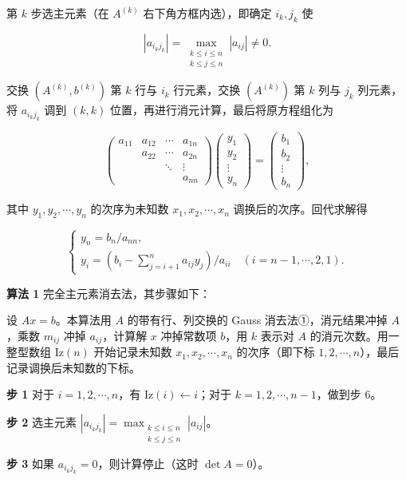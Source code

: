 \documentclass[
  10pt,
  fontset=fandol]{ctexart}
\begin{document}
第 \(k\) 步选主元素（在 \(A^{(k)}\) 右下角方框内选），即确定 \(i_k,j_k\) 使

\[|a_{i_kj_k}|=\max_{\substack{k\le i\le n\\k\le j\le n}}|a_{ij}|\ne0.\]

交换 \((A^{(k)},b^{(k)})\) 第 \(k\) 行与 \(i_k\) 行元素，交换 \((A^{(k)})\) 第 \(k\) 列与 \(j_k\) 列元素，将 \(a_{i_kj_k}\) 调到 \((k,k)\) 位置，再进行消元计算，最后将原方程组化为

\[
\begin{pmatrix}
a_{11}&a_{12}&\cdots&a_{1n}\\
&a_{22}&\cdots&a_{2n}\\
&&\ddots&\vdots\\
&&&a_{nn}
\end{pmatrix}
\begin{pmatrix}y_1\\y_2\\\vdots\\y_n\end{pmatrix}
=\begin{pmatrix}b_1\\b_2\\\vdots\\b_n\end{pmatrix},
\]

其中 \(y_1,y_2,\cdots,y_n\) 的次序为未知数 \(x_1,x_2,\cdots,x_n\) 调换后的次序。回代求解得

\[
\begin{cases}
y_n=b_n/a_{nn},\\
y_i=\displaystyle\left(b_i-\sum_{j=i+1}^{n}a_{ij}y_j\right)/a_{ii}\quad(i=n-1,\cdots,2,1).
\end{cases}
\]

\textbf{算法 1} 完全主元素消去法，其步骤如下：

设 \(Ax=b\)。本算法用 \(A\) 的带有行、列交换的 Gauss 消去法①，消元结果冲掉 \(A\)，乘数 \(m_{ij}\) 冲掉 \(a_{ij}\)，计算解 \(x\) 冲掉常数项 \(b\)，用 \(k\) 表示对 \(A\) 的消元次数。用一整型数组 \(\mathrm{Iz}(n)\) 开始记录未知数 \(x_1,x_2,\cdots,x_n\) 的次序（即下标 \(1,2,\cdots,n\)），最后记录调换后未知数的下标。

\textbf{步 1} 对于 \(i=1,2,\cdots,n\)，有 \(\mathrm{Iz}(i)\leftarrow i\)；对于 \(k=1,2,\cdots,n-1\)，做到步 6。

\textbf{步 2} 选主元素 \(|a_{i_kj_k}|=\max_{\substack{k\le i\le n\\k\le j\le n}}|a_{ij}|\)。

\textbf{步 3} 如果 \(a_{i_kj_k}=0\)，则计算停止（这时 \(\det A=0\)）。
\end{document}
